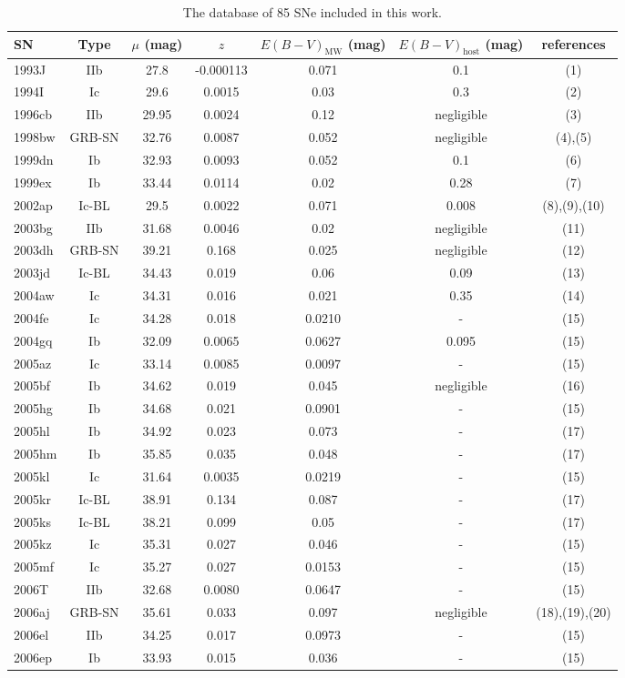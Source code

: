 \documentclass[a4paper,fleqn,usenatbib]{mnras}
\begin{document}
\begin{table}
 \centering
 \begin{minipage}{125mm}
  \caption{The database of 85 SNe included in this work.}
  \begin{tabular}{lcccccc}%
  \hline
 SN & Type & $\mu$ (mag) & $z$ & $E(B-V)_{\mathrm{MW}}$ (mag) & $E(B-V)_{\mathrm{host}}$ (mag) & references \\
  \hline
1993J&IIb&27.8&-0.000113&0.071&0.1&(1)\\
1994I&Ic&29.6&0.0015&0.03&0.3&(2)\\
1996cb&IIb&29.95&0.0024&0.12&negligible&(3)\\
1998bw&GRB-SN&32.76&0.0087&0.052&negligible&(4),(5)\\
1999dn&Ib&32.93&0.0093&0.052&0.1&(6)\\
1999ex&Ib&33.44&0.0114&0.02&0.28&(7)\\
2002ap&Ic-BL&29.5&0.0022&0.071&0.008&(8),(9),(10)\\
2003bg&IIb&31.68&0.0046&0.02&negligible&(11)\\
2003dh&GRB-SN&39.21&0.168&0.025&negligible&(12)\\
2003jd&Ic-BL&34.43&0.019&0.06&0.09&(13)\\
2004aw&Ic&34.31&0.016&0.021&0.35&(14)\\
2004fe&Ic&34.28&0.018&0.0210&-&(15)\\
2004gq&Ib&32.09&0.0065&0.0627&0.095&(15)\\
2005az&Ic&33.14&0.0085&0.0097&-&(15)\\
2005bf&Ib&34.62&0.019&0.045&negligible&(16)\\
2005hg&Ib&34.68&0.021&0.0901&-&(15)\\
2005hl&Ib&34.92&0.023&0.073&-&(17)\\
2005hm&Ib&35.85&0.035&0.048&-&(17)\\
2005kl&Ic&31.64&0.0035&0.0219&-&(15)\\
2005kr&Ic-BL&38.91&0.134&0.087&-&(17)\\
2005ks&Ic-BL&38.21&0.099&0.05&-&(17)\\
2005kz&Ic&35.31&0.027&0.046&-&(15)\\
2005mf&Ic&35.27&0.027&0.0153&-&(15)\\
2006T&IIb&32.68&0.0080&0.0647&-&(15)\\
2006aj&GRB-SN&35.61&0.033&0.097&negligible&(18),(19),(20)\\
2006el&IIb&34.25&0.017&0.0973&-&(15)\\
2006ep&Ib&33.93&0.015&0.036&-&(15)\\

\end{tabular}
\end{minipage}
\end{table}
\end{document}
